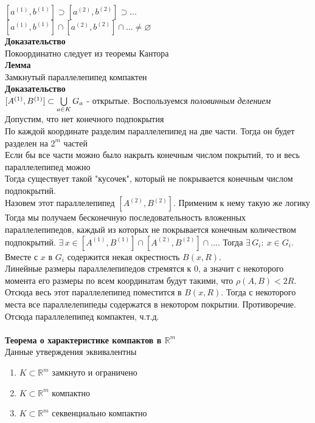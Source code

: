 \documentclass[12pt]{article}
\begin{document}
$[a^{(1)},b^{(1)}] \supset [a^{(2)},b^{(2)}] \supset \ldots$\\
$[a^{(1)},b^{(1)}] \cap [a^{(2)},b^{(2)}] \cap \ldots \neq \varnothing$\\
\textbf{Доказательство}\\
Покоординатно следует из теоремы Кантора\\
\textbf{Лемма}\\
Замкнутый параллелепипед компактен\\
\textbf{Доказательство}\\
$[A^{(1)},B^{(1)}] \subset \bigcup\limits_{a\in K} G_a$ - открытые.
Воспользуемся \textit{половинным делением}\\
Допустим, что нет конечного подпокрытия\\
По каждой координате разделим параллелепипед на две части. Тогда он будет разделен на $2^m$ частей\\
Если бы все части можно было накрыть конечным числом покрытий, то и весь параллелепипед можно\\
Тогда существует такой "кусочек", который не покрывается конечным числом подпокрытий.\\
Назовем этот параллелепипед $[A^{(2)}, B^{(2)}]$. Применим к нему такую же логику\\
Тогда мы получаем бесконечную последовательность вложенных параллелепипедов, каждый из которых не покрывается конечным количеством подпокрытий. $\exists\,x \in [A^{(1)}, B^{(1)}] \cap [A^{(2)}, B^{(2)}] \cap \ldots$. Тогда $\exists\,G_i:\ x \in G_i$. Вместе с $x$ в $G_i$ содержится некая окрестность $B(x, R)$.\\
Линейные размеры параллелепипедов стремятся к 0, а значит с некоторого момента его размеры по всем координатам будут такими, что $\rho(A,B) < 2R$. Отсюда весь этот параллелепипед поместится в $B(x, R)$. Тогда с некоторого места все параллелепипеды содержатся в некотором покрытии. Противоречие.\\
Отсюда параллелепипед компактен, ч.т.д.\\\\
\textbf{Теорема о характеристике компактов в $\mathbb{R}^m$}\\
Данные утверждения эквивалентны
\begin{enumerate}
    \item $K \subset \mathbb{R}^m$ замкнуто и ограничено
    \item $K \subset \mathbb{R}^m$ компактно
    \item $K \subset \mathbb{R}^m$ секвенциально компактно
\end{enumerate}
\end{document}
